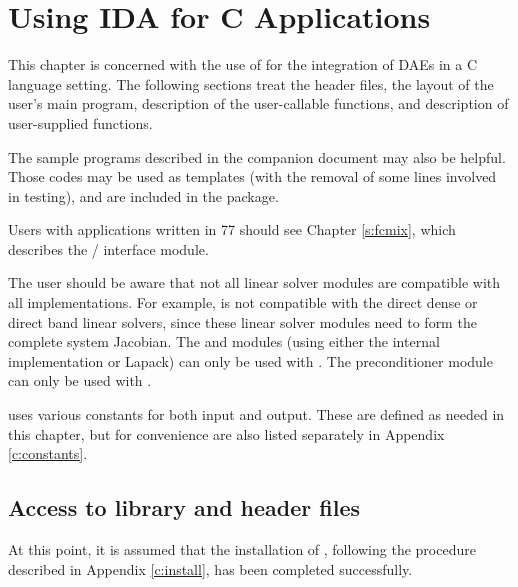 \chapter{Using IDA for C Applications}\label{s:simulation}

This chapter is concerned with the use of {\ida} for the integration
of DAEs in a C language setting.  The following sections treat the header files,
the layout of the user's main program, description of the {\ida} user-callable
functions, and description of user-supplied functions.

The sample programs described in the companion document \cite{ida_ex} 
may also be helpful. Those codes may be used as templates (with the removal of
some lines involved in testing), and are included in the {\ida} package.

Users with applications written in {\F}77 should see Chapter \ref{s:fcmix},
which describes the {\F}/{\C} interface module.

The user should be aware that not all linear solver modules are compatible 
with all {\nvector} implementations. 
For example, {\nvecp} is not compatible with the direct dense or direct band 
linear solvers, since these linear solver modules need to form the complete
system Jacobian.
The {\idadense} and {\idaband} modules (using either the internal implementation
or Lapack) can only be used with {\nvecs}. 
The preconditioner module {\idabbdpre} can only be used with {\nvecp}. 

{\ida} uses various constants for both input and output.  These are
defined as needed in this chapter, but for convenience are also listed
separately in Appendix \ref{c:constants}.

\section{Access to library and header files}\label{ss:file_access}

At this point, it is assumed that the installation of {\ida},
following the procedure described in Appendix \ref{c:install}, has
been completed successfully.

